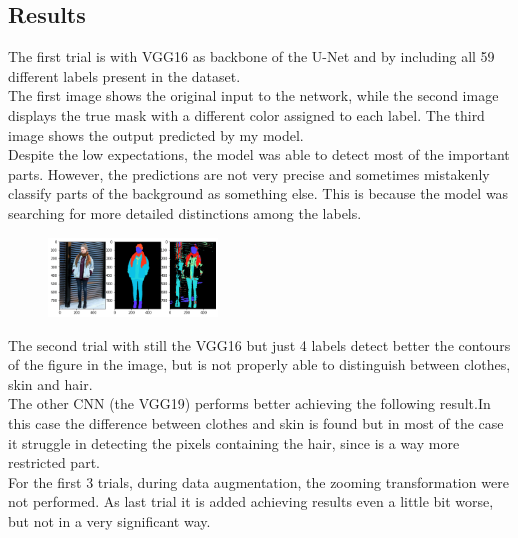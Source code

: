 \documentclass{article}
\begin{document}
\subsection{Results}
The first trial is with VGG16 as backbone of the U-Net and by including all 59 different labels present in the dataset.\\The first image shows the original input to the network, while the second image displays the true mask with a different color assigned to each label. The third image shows the output predicted by my model.\\Despite the low expectations, the model was able to detect most of the important parts. However, the predictions are not very precise and sometimes mistakenly classify parts of the background as something else. This is because the model was searching for more detailed distinctions among the labels.
\begin{figure}[H]
    \begin{center}
    \includegraphics[width=0.4\textwidth]{img/FirstResult2.png}
    \label{fig:res1}
\end{center}
\end{figure}
\begin{multicols}{3}
The second trial with still the VGG16 but just 4 labels detect better the contours of the figure in the image, but is not properly able to distinguish between clothes, skin and hair.\\
\columnbreak
The other CNN (the VGG19) performs better achieving the following result.In this case the difference between clothes and skin is found but in most of the case it struggle in detecting the pixels containing the hair, since is a way more restricted part.\\
\columnbreak
For the first 3 trials, during data augmentation, the zooming transformation were not performed. As last trial it is added achieving results even a little bit worse, but not in a very significant way.
\end{multicols}
\end{document}
